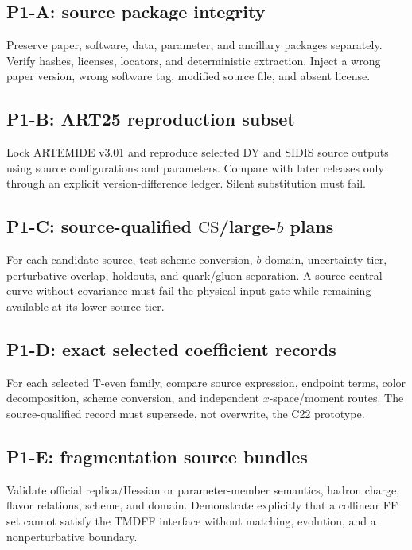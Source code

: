 \documentclass[11pt]{article}
\newcommand{\CS}{\ensuremath{\mathrm{CS}}}
\begin{document}
\subsection{P1-A: source package integrity}

Preserve paper, software, data, parameter, and ancillary packages separately.  Verify hashes, licenses, locators, and deterministic extraction.  Inject a wrong paper version, wrong software tag, modified source file, and absent license.

\subsection{P1-B: ART25 reproduction subset}

Lock ARTEMIDE v3.01 and reproduce selected DY and SIDIS source outputs using source configurations and parameters.  Compare with later releases only through an explicit version-difference ledger.  Silent substitution must fail.

\subsection{P1-C: source-qualified \texorpdfstring{\CS}{CS}/large-\texorpdfstring{\(b\)}{b} plans}

For each candidate source, test scheme conversion, \(b\)-domain, uncertainty tier, perturbative overlap, holdouts, and quark/gluon separation.  A source central curve without covariance must fail the physical-input gate while remaining available at its lower source tier.

\subsection{P1-D: exact selected coefficient records}

For each selected T-even family, compare source expression, endpoint terms, color decomposition, scheme conversion, and independent \(x\)-space/moment routes.  The source-qualified record must supersede, not overwrite, the C22 prototype.

\subsection{P1-E: fragmentation source bundles}

Validate official replica/Hessian or parameter-member semantics, hadron charge, flavor relations, scheme, and domain.  Demonstrate explicitly that a collinear FF set cannot satisfy the TMDFF interface without matching, evolution, and a nonperturbative boundary.
\end{document}
